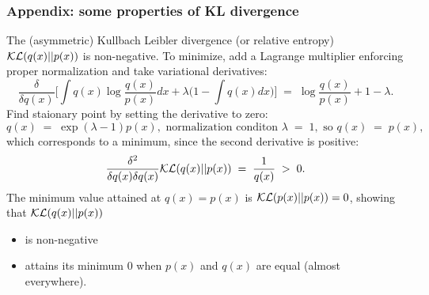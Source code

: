 \documentclass[10pt]{beamer}
\begin{document}
\begin{frame}
\frametitle{Appendix: some properties of KL divergence}

The (asymmetric) Kullbach Leibler divergence (or relative entropy) ${\cal KL}(q(x)||p(x))$ is non-negative. To minimize, add a Lagrange multiplier enforcing proper normalization and take variational derivatives:
\[
\frac{\delta}{\delta q(x)}\Big[\int q(x)\log\frac{q(x)}{p(x)}dx+\lambda\big(1-\int q(x)dx\big)\Big]\;
=\;\log\frac{q(x)}{p(x)}+1-\lambda.
\]
Find staionary point by setting the derivative to zero:
\[
q(x)\;=\;\exp(\lambda-1)p(x),\text{\ \ normalization conditon\ }\lambda\;=\;1, \text{\ \ so\ }q(x)\;=\;p(x),
\]
which corresponds to a minimum, since the second derivative is positive:
\[
\frac{\delta^2}{\delta q(x)\delta q(x)}{\cal KL}(q(x)||p(x))\;=\;\frac{1}{q(x)}\;>\;0.
\]
The minimum value attained at $q(x)=p(x)$ is ${\cal KL}(p(x)||p(x))=0$, showing that 
${\cal KL}(q(x)||p(x))$
\begin{itemize}
\item is non-negative
\item attains its minimum 0 when $p(x)$ and $q(x)$ are equal (almost everywhere).
\end{itemize}
\end{frame}
\end{document}
